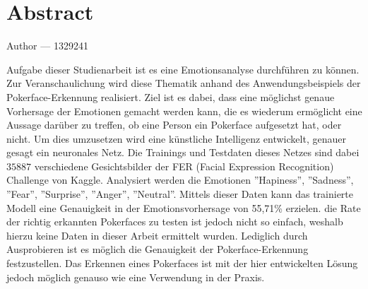 \documentclass[12pt, a4paper]{report}
\makeatletter
\newcommand{\sectionauthor}[1]{%
  {\parindent0pt\vspace*{-5pt}%
  \large{Author --- }
  \linespread{1.1}\large\scshape#1%
  \par\nobreak\vspace*{35pt} }
  \@afterheading%
}
\makeatother
\begin{document}
\section*{Abstract}
\sectionauthor{1329241}
Aufgabe dieser Studienarbeit ist es eine Emotionsanalyse durchführen zu können. Zur Veranschaulichung wird diese Thematik anhand des Anwendungsbeispiels der Pokerface-Erkennung realisiert.
Ziel ist es dabei, dass eine möglichst genaue Vorhersage der Emotionen gemacht werden kann, die es wiederum ermöglicht eine Aussage darüber zu treffen, ob eine Person ein Pokerface aufgesetzt hat, oder nicht.
Um dies umzusetzen wird eine künstliche Intelligenz entwickelt, genauer gesagt ein neuronales Netz. Die Trainings und Testdaten dieses Netzes sind dabei $35887 $ verschiedene Gesichtsbilder der FER (Facial Expression Recognition) Challenge von Kaggle. Analysiert werden die Emotionen ''Hapiness'', ''Sadness'', ''Fear'', ''Surprise'', ''Anger'', ''Neutral''. Mittels dieser Daten kann das trainierte Modell eine Genauigkeit in der Emotionsvorhersage von 55,71\% erzielen. die Rate der richtig erkannten Pokerfaces zu testen ist jedoch nicht so einfach, weshalb hierzu keine Daten in dieser Arbeit ermittelt wurden. Lediglich durch Ausprobieren ist es möglich die Genauigkeit der Pokerface-Erkennung festzustellen. Das Erkennen eines Pokerfaces ist mit der hier entwickelten Lösung jedoch möglich genauso wie eine Verwendung in der Praxis. 


\newpage
\renewcommand{\thefigure}{\Alph{chapter}.\Alph{figure}}
\renewcommand{\thetable}{\Roman{chapter}.\Roman{table}}

\tableofcontents
\listoffigures
\listoftables
\lstlistoflistings
\newpage
\end{document}

